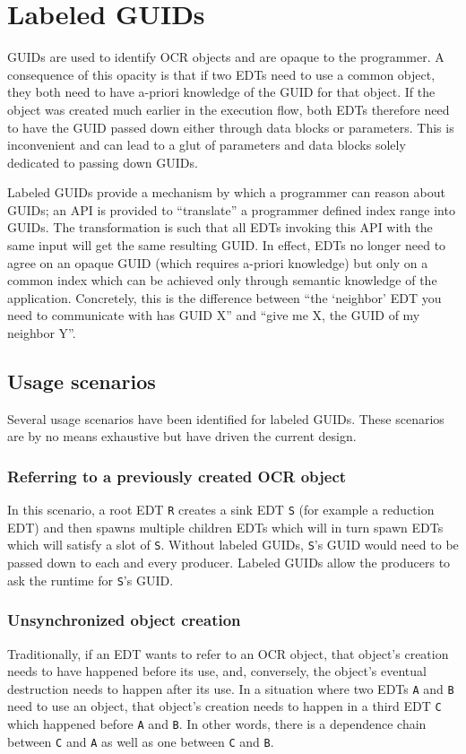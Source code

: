 \section{Labeled GUIDs}
GUIDs are used to identify OCR objects and are opaque to the
programmer. A consequence of this opacity is that if two EDTs need to
use a common object, they both need to have a-priori knowledge of the
GUID for that object. If the object was created much earlier in the
execution flow, both EDTs therefore need to have the GUID passed down
either through data blocks or parameters. This is inconvenient and can
lead to a glut of parameters and data blocks solely dedicated to
passing down GUIDs.

Labeled GUIDs provide a mechanism by which a programmer can
reason about GUIDs; an API is provided to ``translate'' a programmer
defined index range into GUIDs. The transformation is such that all
EDTs invoking this API with the same input will get the same resulting
GUID. In effect, EDTs no longer need to agree on an opaque GUID (which
requires a-priori knowledge) but only on a common index which can be
achieved only through semantic knowledge of the
application. Concretely, this is the difference between ``the
`neighbor' EDT you need to communicate with has GUID X'' and
``give me X, the GUID of my neighbor Y''.
\subsection{Usage scenarios}
Several usage scenarios have been identified for labeled GUIDs. These
scenarios are by no means exhaustive but have driven the current
design.
\subsubsection{Referring to a previously created OCR object}
In this scenario, a root EDT \texttt{R} creates a sink EDT \texttt{S}
(for example a reduction EDT) and then spawns multiple children
EDTs which will in turn spawn EDTs which will satisfy a slot of
\texttt{S}. Without labeled GUIDs, \texttt{S}'s GUID would need to be
passed down to each and every producer. Labeled GUIDs allow the
producers to ask the runtime for \texttt{S}'s GUID.
\subsubsection{Unsynchronized object creation}
Traditionally, if an EDT wants to refer to an OCR object, that
object's creation needs to have happened before its use, and,
conversely, the object's eventual destruction needs to happen after
its use. In a situation where two EDTs \texttt{A} and \texttt{B}
need to use an object, that object's creation needs to happen in a
third EDT \texttt{C} which happened before \texttt{A} and
\texttt{B}. In other words, there is a dependence chain between
\texttt{C} and \texttt{A} as well as one between \texttt{C} and
\texttt{B}.

